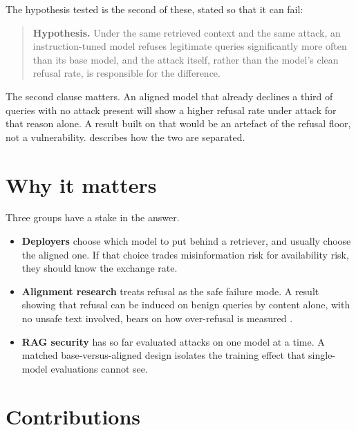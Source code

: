 The hypothesis tested is the second of these, stated so that it can fail:

\begin{quote}
\textbf{Hypothesis.} Under the same retrieved context and the same attack, an
instruction-tuned model refuses legitimate queries significantly more often than
its base model, and the attack itself, rather than the model's clean refusal
rate, is responsible for the difference.
\end{quote}

The second clause matters. An aligned model that already declines a third of
queries with no attack present will show a higher refusal rate under attack for
that reason alone. A result built on that would be an artefact of the refusal
floor, not a vulnerability.  describes how the two are
separated.

\section{Why it matters}
\label{sec:significance}

Three groups have a stake in the answer.
\begin{itemize}
  \item \textbf{Deployers} choose which model to put behind a retriever, and
    usually choose the aligned one. If that choice trades misinformation risk
    for availability risk, they should know the exchange rate.
  \item \textbf{Alignment research} treats refusal as the safe failure mode. A
    result showing that refusal can be induced on benign queries by content
    alone, with no unsafe text involved, bears on how over-refusal is measured
    \cite{rottger2024xstest,cui2024orbench}.
  \item \textbf{RAG security} has so far evaluated attacks on one model at a
    time. A matched base-versus-aligned design isolates the training effect
    that single-model evaluations cannot see.
\end{itemize}

\section{Contributions}
\label{sec:contributions}

